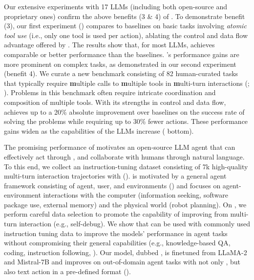 Our extensive experiments with 17 LLMs (including both open-source and proprietary ones) confirm the above benefits (3 
\& 4) of \approach.
% 
To demonstrate benefit (3), our first experiment () compares \approach to baselines on basic tasks involving \textit{atomic tool use} (i.e., only one tool is used per action), ablating the control and data flow advantage offered by \approach.
The results show that, for most LLMs, \approach achieves comparable or better performance than the baselines.
% 
\approach's performance gains are more prominent on complex tasks, as demonstrated in our second experiment (benefit 4).
We curate a new benchmark consisting of 82 human-curated tasks that typically require \textbf{m}ultiple calls to \textbf{m}ultiple tools in \textbf{m}ulti-turn interactions (\evalname; ).
Problems in this benchmark often require intricate coordination and composition of multiple tools.
% 
With its strengths in control and data flow, \approach achieves up to a 20\% absolute improvement over baselines on the success rate of solving the problems while requiring up to 30\% fewer actions.
% 
These performance gains widen as the capabilities of the LLMs increase ( bottom).

The promising performance of \approach motivates an open-source LLM agent that can effectively act through \approach, and collaborate with humans through natural language.
% 
To this end, we collect an instruction-tuning dataset \dataname consisting of 7k high-quality multi-turn interaction trajectories with \approach ().
% 
\dataname is motivated by a general agent framework consisting of agent, user, and environments () and focuses on agent-environment interactions with the computer (information seeking, software package use, external memory) and the physical world (robot planning).
% 
On \dataname, we perform careful data selection to promote the capability of improving from multi-turn interaction (e.g., self-debug).
%
We show that \dataname can be used with commonly used instruction tuning data to improve the models' performance in agent tasks without compromising their general capabilities (e.g., knowledge-based QA, coding, instruction following, ).
% 
Our model, dubbed \modelname, is finetuned from LLaMA-2 \citep{touvron2023llama} and Mistral-7B \citep{jiang2023mistral} and improves on out-of-domain agent tasks with not only \approach, but also text action in a pre-defined format ().

